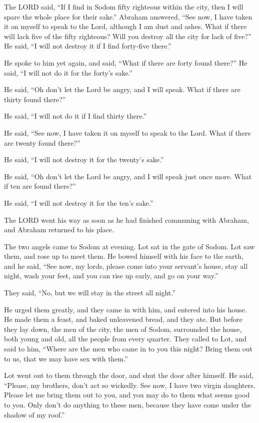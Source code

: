 \myverse{}The LORD said, “If I find in Sodom fifty righteous within the city, then I will spare the whole place for their sake.” \myverse{}Abraham answered, “See now, I have taken it on myself to speak to the Lord, although I am dust and ashes. \myverse{}What if there will lack five of the fifty righteous? Will you destroy all the city for lack of five?”
He said, “I will not destroy it if I find forty-five there.”

\myverse{}He spoke to him yet again, and said, “What if there are forty found there?”
He said, “I will not do it for the forty’s sake.”

\myverse{}He said, “Oh don’t let the Lord be angry, and I will speak. What if there are thirty found there?”

He said, “I will not do it if I find thirty there.”

\myverse{}He said, “See now, I have taken it on myself to speak to the Lord. What if there are twenty found there?”

He said, “I will not destroy it for the twenty’s sake.”

\myverse{}He said, “Oh don’t let the Lord be angry, and I will speak just once more. What if ten are found there?”

He said, “I will not destroy it for the ten’s sake.”

\myverse{}The LORD went his way as soon as he had finished communing with Abraham, and Abraham returned to his place.

\mychapter{}
\myverse*{}The two angels came to Sodom at evening. Lot sat in the gate of Sodom. Lot saw them, and rose up to meet them. He bowed himself with his face to the earth, \myverse{}and he said, “See now, my lords, please come into your servant’s house, stay all night, wash your feet, and you can rise up early, and go on your way.”

They said, “No, but we will stay in the street all night.”

\myverse{}He urged them greatly, and they came in with him, and entered into his house. He made them a feast, and baked unleavened bread, and they ate. \myverse{}But before they lay down, the men of the city, the men of Sodom, surrounded the house, both young and old, all the people from every quarter. \myverse{}They called to Lot, and said to him, “Where are the men who came in to you this night? Bring them out to us, that we may have sex with them.”

\myverse{}Lot went out to them through the door, and shut the door after himself. \myverse{}He said, “Please, my brothers, don’t act so wickedly. \myverse{}See now, I have two virgin daughters. Please let me bring them out to you, and you may do to them what seems good to you. Only don’t do anything to these men, because they have come under the shadow of my roof.”

